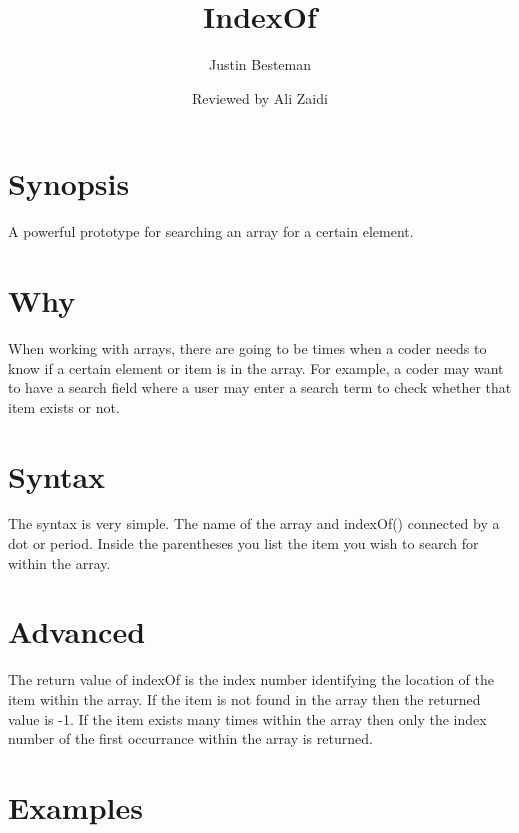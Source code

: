 \documentclass[12pt, letterpaper]{article}
\title{IndexOf}
\author{Justin Besteman}
\date{Reviewed by Ali Zaidi}
\begin{document}
\maketitle


\section*{Synopsis}

A powerful prototype for searching an array for a certain element.

\section*{Why}

When working with arrays, there are going to be times when a coder needs to know if a certain element or item is in the array. For example, a coder may want to have a search field where a user may enter a search term to check whether that item exists or not.

\section*{Syntax}

The syntax is very simple. The name of the array and indexOf() connected by a dot or period. Inside the parentheses you list the item you wish to search for within the array.

\section*{Advanced}

The return value of indexOf is the index number identifying the location of the item within the array. If the item is not found in the array then the returned value is -1. If the item exists many times within the array then only the index number of the first occurrance within the array is returned.\\

\section*{Examples}
\end{document}
